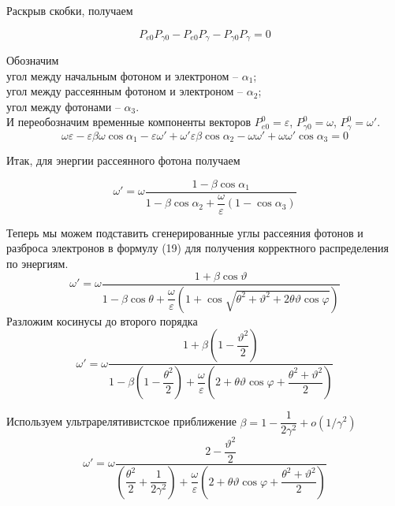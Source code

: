 \documentclass[12pt,a4paper]{article}
\begin{document}
Раскрыв скобки, получаем

\begin{equation}
   P_{e0}P_{\gamma0} - P_{e0}P_{\gamma} - P_{\gamma0}P_{\gamma}  = 0
\end{equation}

Обозначим \\
угол между начальным фотоном и электроном -- $\alpha_1$;  \\
угол между рассеянным фотоном и электроном -- $\alpha_2$; \\
угол между фотонами -- $\alpha_3$. \\
И переобозначим временные компоненты векторов $P^0_{e0} = \varepsilon$, $P^0_{\gamma0} = \omega$, $P^0_{\gamma} = \omega'$.
\begin{equation}
    \omega \varepsilon - \varepsilon \beta \omega \cos \alpha_1 - \varepsilon\omega' + \omega' \varepsilon \beta \cos \alpha_2 - \omega \omega' + \omega\omega' \cos \alpha_3 = 0
\end{equation}

Итак, для энергии рассеянного фотона получаем

\begin{equation}
    \omega' = \omega \dfrac{1 - \beta\cos\alpha_1 }{1 - \beta \cos\alpha_2 + \dfrac{\omega}{\varepsilon}\left(1-\cos\alpha_3 \right)}
\end{equation}



Теперь мы можем подставить сгенерированные углы рассеяния фотонов и разброса электронов в формулу (19) для получения корректного распределения по энергиям.
\begin{equation}
    \omega' = \omega \dfrac{1 + \beta\cos\vartheta  }{1 - \beta \cos\theta + \dfrac{\omega}{\varepsilon}\left(1+\cos\sqrt{\theta^2 + \vartheta^2 + 2\theta\vartheta\cos\varphi}\right)}
\end{equation}
Разложим косинусы до второго порядка
\begin{equation}
    \omega' = \omega \dfrac{1+\beta \left(1 - \dfrac{\vartheta^2}{2}  \right)}{1 - \beta \left( 1 - \dfrac{\theta^2}{2} \right) + \dfrac{\omega}{\varepsilon}\left(2 + \theta\vartheta\cos\varphi+\dfrac{\theta^2 + \vartheta^2 }{2}\right)}
\end{equation}

Используем ультрарелятивистское приближение $\beta = 1 - \dfrac{1}{2\gamma^2} + o(1/\gamma^2)$
\begin{equation}
    \omega' = \omega \dfrac{2 - \dfrac{\vartheta^2}{2} }{\left(\dfrac{\theta^2}{2} + \dfrac{1}{2\gamma^2} \right) + \dfrac{\omega}{\varepsilon}\left(2 + \theta\vartheta\cos\varphi+\dfrac{\theta^2 + \vartheta^2 }{2}\right)}
\end{equation}
\end{document}
